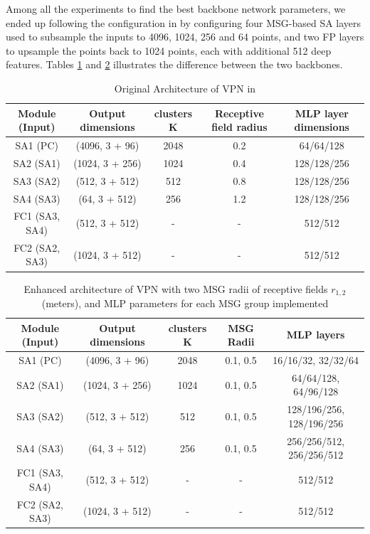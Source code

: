 \documentclass[10pt,twocolumn,letterpaper]{article}
\begin{document}
Among all the experiments to find the best backbone network parameters, we ended up following the configuration in \cite{RCNN paper} by configuring four MSG-based SA layers used to subsample the inputs to 4096, 1024, 256 and 64 points, and two FP layers to upsample the points back to 1024 points, each with additional 512 deep features. Tables \ref{tab:votenet_oringinal} and \ref{tab:votenet_msg} illustrates the difference between the two backbones.


\begin{table}
\label{tab:votenet_oringinal}
\begin{center}
\begin{tabular}{|c|c|c|c|c|}
\hline
Module (Input) & Output dimensions & clusters K & Receptive field radius & MLP layer dimensions \\
\hline\hline
SA1 (PC) & (4096, 3 + 96) & 2048 & 0.2 & 64/64/128 \\
SA2 (SA1) & (1024, 3 + 256) & 1024 & 0.4 & 128/128/256 \\
SA3 (SA2) & (512, 3 + 512) & 512 & 0.8 & 128/128/256 \\
SA4 (SA3) & (64, 3 + 512) & 256 & 1.2 & 128/128/256 \\
FC1 (SA3, SA4) & (512, 3 + 512) & - & - & 512/512 \\
FC2 (SA2, SA3) & (1024, 3 + 512) & - & - & 512/512 \\
\hline
\end{tabular}
\end{center}
\caption{Original Architecture of VPN in \cite{votenet paper}}
\end{table}



\begin{table}
\label{tab:votenet_msg}
\begin{center}
\begin{tabular}{|c|c|c|c|c|}
\hline
Module (Input) & Output dimensions & clusters K & MSG Radii & MLP layers \\
\hline\hline
SA1 (PC) & (4096, 3 + 96) & 2048 & 0.1,  0.5 & 16/16/32, 32/32/64 \\
SA2 (SA1) & (1024, 3 + 256) & 1024 & 0.1,  0.5 & 64/64/128,  64/96/128 \\
SA3 (SA2) & (512, 3 + 512) & 512 & 0.1,  0.5 & 128/196/256,  128/196/256 \\
SA4 (SA3) & (64, 3 + 512) & 256 & 0.1,  0.5 & 256/256/512,  256/256/512 \\
FC1 (SA3, SA4) & (512, 3 + 512) & - & - & 512/512 \\
FC2 (SA2, SA3) & (1024, 3 + 512) & - & - & 512/512 \\
\hline
\end{tabular}
\end{center}
\caption{Enhanced architecture of VPN with two MSG radii of receptive fields $r_{1,2}$ (meters), and MLP parameters for each MSG group implemented \cite{RCNN paper}}
\end{table}
\end{document}

